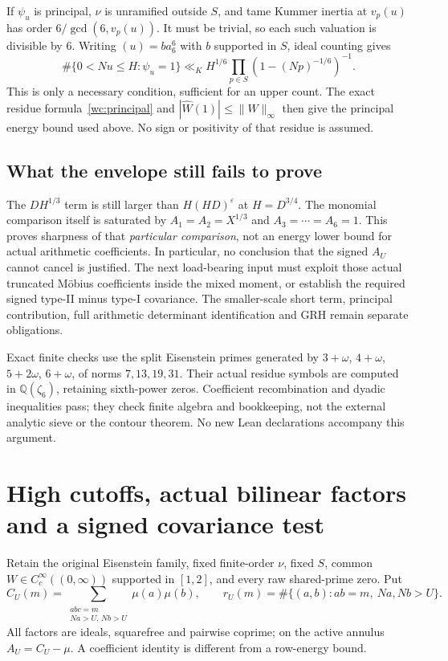 \documentclass[11pt]{article}
\theoremstyle{definition}\newtheorem{definition}[theorem]{Definition}
\theoremstyle{remark}\newtheorem{remark}[theorem]{Remark}
\begin{document}
If $\psi_u$ is principal, $\nu$ is unramified outside $S$, and tame
Kummer inertia at $v_p(u)$ has order $6/\gcd(6,v_p(u))$.
It must be trivial, so each such valuation is divisible by $6$.
Writing $(u)=ba_6^6$ with $b$ supported in $S$, ideal counting gives
\[
 \#\{0<Nu\le H:\psi_u=1\}
 \ll_K H^{1/6}\prod_{p\in S}(1-(Np)^{-1/6})^{-1}.
\]
This is only a necessary condition, sufficient for an upper count.
The exact residue formula~\eqref{wc:principal} and
$|\widehat W(1)|\le\|W\|_\infty$ then give the principal energy
bound used above. No sign or positivity of that residue is assumed.

\subsection{What the envelope still fails to prove}
The $DH^{1/3}$ term is still larger than $H(HD)^\varepsilon$ at
$H=D^{3/4}$. The monomial comparison itself is saturated by
$A_1=A_2=X^{1/3}$ and $A_3=\cdots=A_6=1$.
This proves sharpness of that \emph{particular comparison}, not an
energy lower bound for actual arithmetic coefficients. In particular,
no conclusion that the signed $A_U$ cannot cancel is justified.
The next load-bearing input must exploit those actual truncated M\"obius
coefficients inside the mixed moment, or establish the required signed
type-II minus type-I covariance. The smaller-scale short term, principal
contribution, full arithmetic determinant identification and GRH remain
separate obligations.

Exact finite checks use the split Eisenstein primes generated by
$3+\omega$, $4+\omega$, $5+2\omega$, $6+\omega$, of norms
$7,13,19,31$. Their actual residue symbols are computed in
$\mathbb Q(\zeta_6)$, retaining sixth-power zeros. Coefficient
recombination and dyadic inequalities pass; they check finite algebra
and bookkeeping, not the external analytic sieve or the contour theorem.
No new Lean declarations accompany this argument.

\section{High cutoffs, actual bilinear factors and a signed covariance test}\label{sb:core}
Retain the original Eisenstein family, fixed finite-order $\nu$, fixed $S$,
common $W\in C_c^\infty((0,\infty))$ supported in $[1,2]$, and every raw
shared-prime zero. Put
\[
 C_U(m)=\sum_{\substack{abc=m\\Na>U,\,Nb>U}}\mu(a)\mu(b),\qquad
 r_U(m)=\#\{(a,b):ab=m,\ Na,Nb>U\}.
\]
All factors are ideals, squarefree and pairwise coprime; on the active
annulus $A_U=C_U-\mu$. A coefficient identity is different from a row-energy bound.
\end{document}
